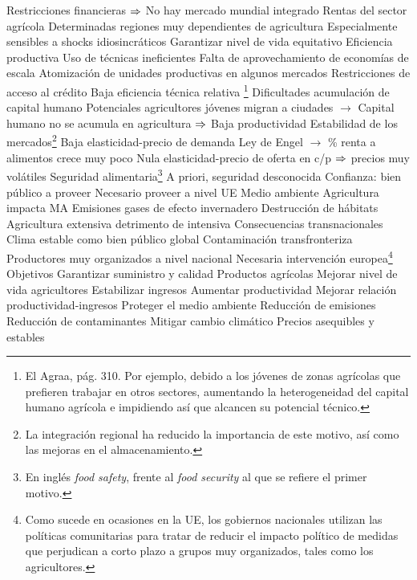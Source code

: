 \documentclass{nuevotema}
\begin{document}
\begin{esquemal}
				\4[] Restricciones financieras
				\4[] $\Rightarrow$ No hay mercado mundial integrado
			\3 Rentas del sector agrícola
				\4 Determinadas regiones muy dependientes de agricultura
				\4[] Especialmente sensibles a shocks idiosincráticos
				\4 Garantizar nivel de vida equitativo
			\3 Eficiencia productiva
				\4 Uso de técnicas ineficientes
				\4 Falta de aprovechamiento de economías de escala
				\4[] Atomización de unidades productivas en algunos mercados
				\4 Restricciones de acceso al crédito
				\4 Baja eficiencia técnica relativa \footnote{El Agraa, pág. 310. Por ejemplo, debido a los jóvenes de zonas agrícolas que prefieren trabajar en otros sectores, aumentando la heterogeneidad del capital humano agrícola e impidiendo así que alcancen su potencial técnico.}
				\4 Dificultades acumulación de capital humano
				\4[] Potenciales agricultores jóvenes migran a ciudades
				\4[] $\to$ Capital humano no se acumula en agricultura
				\4[] $\Rightarrow$ Baja productividad
			\3 Estabilidad de los mercados\footnote{La integración regional ha reducido la importancia de este motivo, así como las mejoras en el almacenamiento.}
				\4 Baja elasticidad-precio de demanda
				\4[] Ley de Engel
				\4[] $\to$ \% renta a alimentos crece muy poco
				\4 Nula elasticidad-precio de oferta en c/p
				\4[] $\Rightarrow$ precios muy volátiles
			\3 Seguridad alimentaria\footnote{En inglés \textit{food safety}, frente al \textit{food security} al que se refiere el primer motivo.}
				\4 A priori, seguridad desconocida
				\4 Confianza: bien público a proveer
				\4 Necesario proveer a nivel UE
			\3 Medio ambiente
				\4 Agricultura impacta MA
				\4[] Emisiones gases de efecto invernadero
				\4[] Destrucción de hábitats
				\4[] Agricultura extensiva detrimento de intensiva
				\4 Consecuencias transnacionales
				\4[] Clima estable como bien público global
				\4[] Contaminación transfronteriza
				\4 Productores muy organizados a nivel nacional
				\4 Necesaria intervención europea\footnote{Como sucede en ocasiones en la UE, los gobiernos nacionales utilizan las políticas comunitarias para tratar de reducir el impacto político de medidas que perjudican a corto plazo a grupos muy organizados, tales como los agricultores.}
		\2 Objetivos
			\3 Garantizar suministro y calidad
				\4 Productos agrícolas
			\3 Mejorar nivel de vida agricultores
				\4 Estabilizar ingresos
				\4 Aumentar productividad
				\4 Mejorar relación productividad-ingresos
			\3 Proteger el medio ambiente
				\4 Reducción de emisiones
				\4 Reducción de contaminantes
				\4 Mitigar cambio climático
			\3 Precios asequibles y estables

\end{esquemal}
\end{document}
